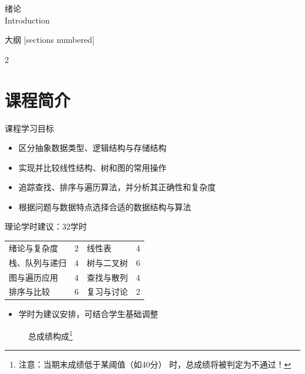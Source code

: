 \begin{standout}[第〇章]
	绪论\\
	Introduction
\end{standout}

\begin{frame}{大纲}
	[sections numbered]
	\begin{multicols}{2}
		\tableofcontents
	\end{multicols}
\end{frame}

\section{课程简介}

\begin{frame}{课程学习目标}
	\begin{itemize}
		\item 区分抽象数据类型、逻辑结构与存储结构
		\item 实现并比较线性结构、树和图的常用操作
		\item 追踪查找、排序与遍历算法，并分析其正确性和复杂度
		\item 根据问题与数据特点选择合适的数据结构与算法
	\end{itemize}
\end{frame}

\begin{frame}{理论学时建议：32学时}
	\begin{center}
		\begin{tabular}{lr|lr}
			\toprule
			绪论与复杂度 & 2 & 线性表 & 4 \\
			栈、队列与递归 & 4 & 树与二叉树 & 6 \\
			图与遍历应用 & 4 & 查找与散列 & 4 \\
			排序与比较 & 6 & 复习与讨论 & 2 \\
			\bottomrule
		\end{tabular}
	\end{center}
	\begin{itemize}
		\item 学时为建议安排，可结合学生基础调整
	\end{itemize}
\end{frame}

\begin{frame}{\insertsectionhead}
	\begin{figure}
		\centering
		\caption{总成绩构成\footnote{\alert{注意：当期末成绩低于某阈值（如40分）
					时，总成绩将被判定为不通过！}}}
		\label{fig:score_composition}
	\end{figure}
\end{frame}

